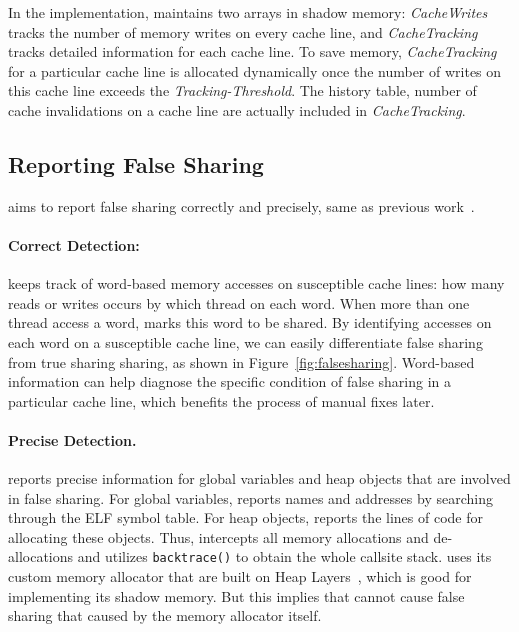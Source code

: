 In the implementation, \Cheetah{} maintains two arrays in shadow memory: {\it CacheWrites} tracks the number of memory writes on every cache line, and {\it CacheTracking} tracks detailed information for each cache line. To save memory, {\it CacheTracking} for a particular cache line is allocated dynamically once the number of writes on this cache line exceeds the {\it Tracking-Threshold}. The history table, number of cache invalidations on a cache line are actually included in {\it CacheTracking}. 
 
 \subsection{Reporting False Sharing}
\Cheetah{} aims to report false sharing correctly and precisely, same as previous work~\cite{sheriff, Predator}. 

\paragraph{Correct Detection:} \Cheetah{} keeps track of word-based memory accesses on susceptible cache lines: how many reads or writes occurs by which thread on each word. When more than one thread access a word, \Cheetah{} marks this word to be shared. By identifying accesses on each word on a susceptible cache line, we can easily differentiate false sharing from true sharing sharing, as shown in Figure~\ref{fig:falsesharing}. Word-based information can help diagnose the specific condition of false sharing in a particular cache line, which benefits the process of manual fixes later.  

\paragraph{Precise Detection.} \Cheetah{} reports precise information for global variables and heap objects that are involved in false sharing. For global variables, \Cheetah{} reports names and addresses by searching through the ELF symbol table. For heap objects, \Cheetah{} reports the lines of code for allocating these objects.  
Thus, \Cheetah{} intercepts all memory allocations and de-allocations and utilizes \texttt{backtrace()} to obtain the whole callsite stack.  \Cheetah{} uses its custom memory allocator that are built on Heap Layers~\cite{heaplayers}, which is good for implementing its shadow memory. But this implies that \Cheetah{} cannot cause false sharing that caused by the memory allocator itself. 


